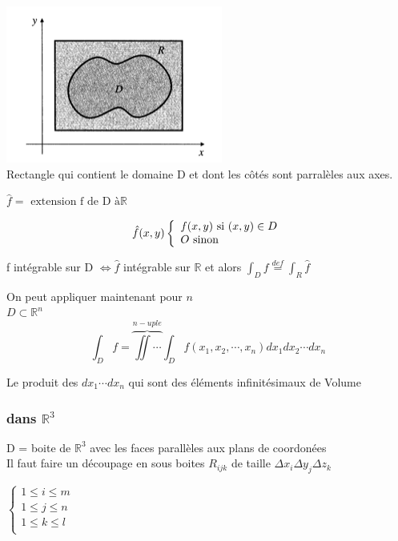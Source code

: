 \includegraphics[scale=1]{image4.png}
\\Rectangle qui contient le domaine D et dont les côtés sont parralèles aux axes.

$\hat{f} = \text{ extension f de D à} \mathbb{R}$


\[
\hat{f}(x,y)\left\{
\begin{array}{l r}
f(x,y)\text{ si }(x,y)\in D\\
O\text{ sinon}\\
\end{array}
\right.
\]

f intégrable sur D $ \Longleftrightarrow \hat{f}$ intégrable sur $\mathbb{R}$ et alors
$\int_D f \overset{def}{=}\int_R \hat{f} $


On peut appliquer maintenant pour $n$
\\
$ D \subset \mathbb{R}^n$
$$\int_D f = \overbrace{\iint \cdots}^{n-uple} \int_D f(x_1,x_2,\cdots,x_n)dx_1 dx_2 \cdots dx_n $$

Le produit des $dx_1 \cdots dx_n $ qui sont des éléments infinitésimaux de Volume






\subsubsection{dans $\mathbb{R}^3$}





D = boite de $\mathbb{R}^3$ avec les faces parallèles aux plans de coordonées\\

Il faut faire un découpage en sous boites $ R_{ijk} $ de taille $\Delta x_i \Delta y_j \Delta z_k$

$\left\{
\begin{array}{l}
1 \le i \le m \\
1 \le j \le n \\
1 \le k \le l \\
\end{array}
\right. $

